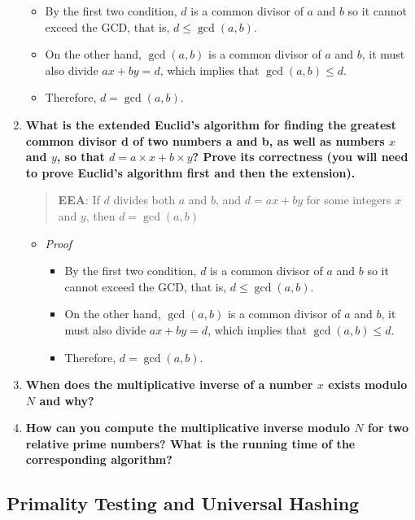 \documentclass[a4paper,11pt]{article}
\begin{document}
\begin{enumerate}
  \begin{itemize}
  \itemsep1pt\parskip0pt
  \item
    By the first two condition, $d$ is a common divisor of $a$ and $b$
    so it cannot exceed the GCD, that is, $d \le \gcd(a, b)$.
  \item
    On the other hand, $\gcd(a, b)$ is a common divisor of $a$ and $b$,
    it must also divide $ax + by = d$, which implies that
    $\gcd(a, b) \le d$.
  \item
    Therefore, $d = \gcd(a, b)$.
  \end{itemize}
\item
  \textbf{What is the extended Euclid's algorithm for finding the
  greatest common divisor d of two numbers a and b, as well as numbers
  $x$ and $y$, so that $d = a\times x+b \times y$? Prove its correctness
  (you will need to prove Euclid's algorithm first and then the
  extension).}

  \begin{quote}
  \textbf{EEA}: If $d$ divides both $a$ and $b$, and $d = ax + by$ for
  some integers $x$ and $y$, then $d = \gcd(a, b)$
  \end{quote}

  \begin{itemize}
  \itemsep1pt\parskip0pt
  \item
    \emph{Proof}

    \begin{itemize}
    \itemsep1pt\parskip0pt
    \item
      By the first two condition, $d$ is a common divisor of $a$ and $b$
      so it cannot exceed the GCD, that is, $d \le \gcd(a, b)$.
    \item
      On the other hand, $\gcd(a, b)$ is a common divisor of $a$ and
      $b$, it must also divide $ax + by = d$, which implies that
      $\gcd(a, b) \le d$.
    \item
      Therefore, $d = \gcd(a, b)$.
    \end{itemize}
  \end{itemize}
\item
  \textbf{When does the multiplicative inverse of a number $x$ exists
  modulo $N$ and why?}
\item
  \textbf{How can you compute the multiplicative inverse modulo $N$ for
  two relative prime numbers? What is the running time of the
  corresponding algorithm?}
\end{enumerate}

\subsection{Primality Testing and Universal
Hashing}\label{primality-testing-and-universal-hashing}
\end{document}
